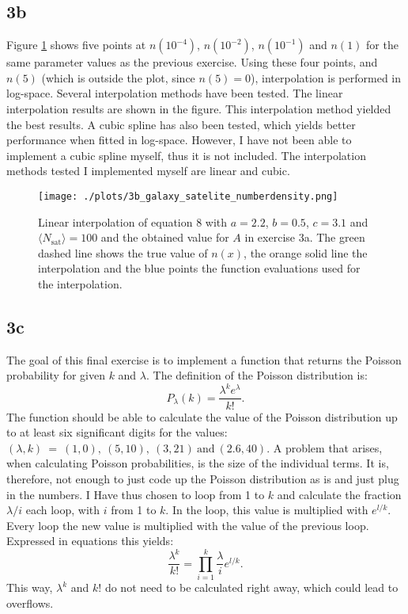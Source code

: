 \subsection*{3b}
Figure \ref{fig:3b} shows five points at $n(10^{−4})$, $n(10^{−2})$, $n(10^{−1})$ and $n(1)$ for the same parameter values as the previous exercise. Using these four points, and $n(5)$ (which is outside the plot, since $n(5)=0$), interpolation is performed in log-space. Several interpolation methods have been tested. The linear interpolation results are shown in the figure. This interpolation method yielded the best results. A cubic spline has also been tested, which yields better performance when fitted in log-space. However, I have not been able to implement a cubic spline myself, thus it is not included. The interpolation methods tested I implemented myself are linear and cubic.

\begin{figure}[!ht]
  \centering
  \texttt{[image: ./plots/3b\_galaxy\_satelite\_numberdensity.png]}
  \caption{Linear interpolation of equation 8 with $a = 2.2$, $b = 0.5$, $c = 3.1$ and $\langle N_\mathrm{sat}\rangle = 100$ and the obtained value for $A$ in exercise 3a. The green dashed line shows the true value of $n(x)$, the orange solid line the interpolation and the blue points the function evaluations used for the interpolation.}
  \label{fig:3b}
\end{figure}

\subsection*{3c}
The goal of this final exercise is to implement a function that returns the Poisson probability for given $k$ and $\lambda$. The definition of the Poisson distribution is:
\begin{equation}
  P_\lambda(k)=\frac{\lambda^k e^{\lambda}}{k!}.
\end{equation}
The function should be able to calculate the value of the Poisson distribution up to at least six significant digits for the values: $(\lambda, k)\ =\ (1, 0),\ (5, 10),\ (3, 21)\ \mathrm{and}\ (2.6, 40)$. A problem that arises, when calculating Poisson probabilities, is the size of the individual terms. It is, therefore, not enough to just code up the Poisson distribution as is and just plug in the numbers. I Have thus chosen to loop from 1 to $k$ and calculate the fraction $\lambda / i$ each loop, with $i$ from 1 to $k$. In the loop, this value is multiplied with $e^{l/k}$. Every loop the new value is multiplied with the value of the previous loop. Expressed in equations this yields:
\begin{equation}
  \frac{\lambda^k}{k!} = \prod_{i=1}^k \frac{\lambda}{i} e^{l/k}.
\end{equation}
This way, $\lambda^k$ and $k!$ do not need to be calculated right away, which could lead to overflows. 

